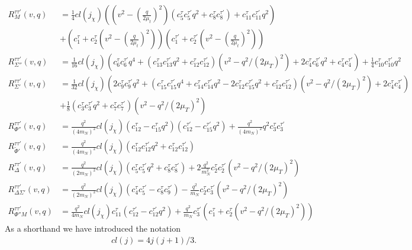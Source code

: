 \documentclass[11pt]{amsart}
\begin{document}
\begin{align}
R_{M}^{\tau\tau'}(v,q) &= 
\frac{1}{4}cl(j_\chi) \left(
	(v^2-(\frac{q}{2\mu_t})^2)(c_5^{\tau}c_5^{\tau'}q^2 + c_8^{\tau}c_8^{\tau'})
	+ c_{11}^{\tau}c_{11}^{\tau'}q^2
\right)\\
& + (c_1^{\tau} + c_2^{\tau}(v^2-(\frac{q}{2\mu_t})^2) )(c_1^{\tau'} + c_2^{\tau'}(v^2-(\frac{q}{2\mu_t})^2) )
\\
R_{\Sigma''}^{\tau\tau'}(v,q) &= 
\frac{1}{16}cl(j_\chi) \left(
	c_6^{\tau}c_6^{\tau'}q^4 + (c_{13}^{\tau}c_{13}^{\tau'}q^2 +c_{12}^{\tau} c_{12}^{\tau'} )
	(v^2-q^2/(2\mu_T)^2) + 2c_4^\tau c_6^{\tau'} q^2 + c_4^\tau c_4^{\tau '}
\right )
+ \frac{1}{4} c_{10}^\tau c_{10}^{\tau '} q^2
\\
R_{\Sigma'}^{\tau\tau'}(v,q) &= 
\frac{1}{32} cl(j_\chi) \left (
	2c_{9}^{\tau}c_{9}^{\tau'}q^2
	+ (
		c_{15}^{\tau}c_{15}^{\tau'}q^4
		+ c_{14}^{\tau}c_{14}^{\tau'}q^2
		-2 c_{12}^{\tau}c_{15}^{\tau'} q^2
		+c_{12}^{\tau}c_{12}^{\tau'}
	) (v^2-q^2/(2\mu_T)^2)
	+2 c_{4}^{\tau}c_{4}^{\tau'}
\right)\\
&+\frac{1}{8} \left(
	c_{3}^{\tau}c_3^{\tau'}q^2
	+ c_{7}^{\tau}c_{7}^{\tau'}
\right) (v^2-q^2/(2\mu_T)^2)
\\
R_{\Phi''}^{\tau\tau'}(v,q) &= 
\frac{q^2}{(4m_N)^2}cl(j_\chi) \left(
	c_{12}^\tau - c_{15}^{\tau} q^2
\right ) \left(
	c_{12}^{\tau '}-c_{15}^{\tau '}q^2
\right )
+ \frac{q^2}{(4m_N)^2}q^2c_3^\tau c_3^{\tau'}
\\
R_{\tilde{\Phi}'}^{\tau\tau'}(v,q) &= 
\frac{q^2}{(4m_N)^2}cl(j_\chi) \left(
	c_{12}^\tau c_{12}^{\tau'} q^2
	+ c_{12}^\tau c_{12}^{\tau'} 
\right)
\\
R_{\Delta}^{\tau\tau'}(v,q) &= 
\frac{q^2}{(2m_N)^2}cl(j_\chi) \left(
	c_{5}^{\tau}c_{5}^{\tau'}q^2
	+ c_{8}^{\tau}c_{8}^{\tau'}
\right)
+2\frac{q^2}{m_N^2} c_{2}^{\tau}c_{2}^{\tau'}
(v^2-q^2/(2\mu_T)^2)
\\
R_{\Delta \Sigma'}^{\tau\tau'}(v,q) &= 
\frac{q^2}{(2m_N)^2}cl(j_\chi) \left(
c_{4}^{\tau}c_{5}^{\tau'} - c_{8}^{\tau}c_{9}^{\tau'}
\right)
- \frac{q^2}{m_N}c_{2}^{\tau}c_{3}^{\tau'} (v^2-q^2/(2\mu_T)^2)
\\
R_{\Phi''M}^{\tau\tau'}(v,q) &= 
\frac{q^2}{4m_N} cl(j_\chi) c_{11}^{\tau} 
\left(
c_{12}^{\tau'} - c_{12}^{\tau'} q^2
\right)
+ \frac{q^2}{m_N} c_{3}^{\tau'} \left(
	c_{1}^{\tau} + c_{2}^{\tau} (v^2-q^2/(2\mu_T)^2)
\right)
\end{align}
As a shorthand we have introduced the notation 
\begin{align}
	cl(j) = 4j(j+1)/3.
\end{align}
\end{document}

